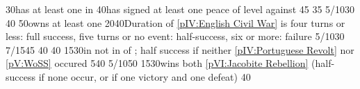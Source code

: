  
%
%
%
%
%
%
%
%
%
%
%
%
%
%
%
%
%
{}{30}{\paysmajeurAngleterre has at least one \COL in \continentAmerica}%
%
%
{}{40}{\paysmajeurAngleterre has signed at least one peace of level 
  against \paysmajeurFrance}%
%
%
%
%
%
%
%
{}{45}{}%
%
%
%
%
{}{35}{}%
%
%
{5/10}{30}{}%
%
%
%
%
%
{}{40}{}%
%
%
{}{50}{\paysmajeurAngleterre owns at least one }%
%
%
{20}{40}{Duration of \ref{pIV:English Civil War} is four turns or less: full
  success, five turns or no event: half-success, six or more: failure}%
%
%
{5/10}{30}{}%
%
%
%
{7/15}{45}{}%
%
%
{}{40}{}%
%
%
{}{40}{}%
%
%
{15}{30}{\paysPortugal in not in \ANNEXION of \paysmajeurEspagne;
  half success if neither \ref{pIV:Portuguese Revolt} nor \ref{pV:WoSS}
  occured}%
%
%
{5}{40}{}%
%
%
%
{5/10}{50}{}%
%
%
{15}{30}{\paysmajeurAngleterre wins both \ref{pVI:Jacobite Rebellion}
  (half-success if none occur, or if one victory and one defeat)}%
%
%
{}{40}{}%
%
%
